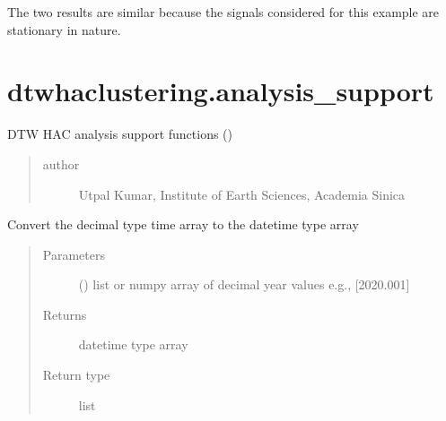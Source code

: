 \documentclass[letterpaper,10pt,english]{sphinxmanual}
\begin{document}
\sphinxAtStartPar
The two results are similar because the signals considered for this example are stationary in nature.


\chapter{dtwhaclustering.analysis\_support}
\label{\detokenize{modules/analysis_support:module-dtwhaclustering.analysis_support}}\label{\detokenize{modules/analysis_support:dtwhaclustering-analysis-support}}\label{\detokenize{modules/analysis_support::doc}}
\sphinxAtStartPar
DTW HAC analysis support functions ()
\begin{quote}\begin{description}
\item[{author}] \leavevmode
\sphinxAtStartPar
Utpal Kumar, Institute of Earth Sciences, Academia Sinica

\end{description}\end{quote}

\begin{fulllineitems}
\label{\detokenize{modules/analysis_support:dtwhaclustering.analysis_support.dec2dt}}
\sphinxAtStartPar
Convert the decimal type time array to the date\sphinxhyphen{}time type array
\begin{quote}\begin{description}
\item[{Parameters}] \leavevmode
\sphinxAtStartPar
{} () \textendash{} list or numpy array of decimal year values e.g., {[}2020.001{]}

\item[{Returns}] \leavevmode
\sphinxAtStartPar
date\sphinxhyphen{}time type array

\item[{Return type}] \leavevmode
\sphinxAtStartPar
list

\end{description}\end{quote}

\end{fulllineitems}
\end{document}
